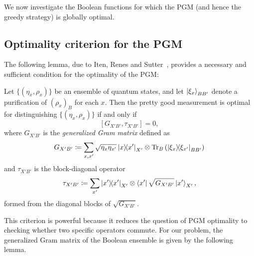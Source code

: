 We now investigate the Boolean functions for which the PGM (and hence the greedy strategy) is globally optimal.


\subsection{Optimality criterion for the PGM}

The following lemma, due to Iten, Renes and Sutter~\cite{iten2016pretty}, provides a necessary and sufficient condition for the optimality of the PGM:

\begin{lemma}\label{lem:ch5_qseq-pgmopt}
    Let $\{(\eta_x, \rho_x)\}$ be an ensemble of quantum states, and let $\ket{\xi_x}_{BB'}$ denote a purification of $(\rho_x)_B$ for each $x$.
    Then the pretty good measurement is optimal for distinguishing $\{(\eta_x, \rho_x)\}$ if and only if
    \begin{equation}\label{eq:ch5_qseq-PGM}
        [G_{X'B'},\tau_{X'B'}]=0,
    \end{equation}
    where $G_{X'B'}$ is the \emph{generalized Gram matrix} defined as
    \begin{equation}\label{eq:ch5_qseq-gengram}
        G_{X'B'} \coloneqq \sum_{x,x'} \sqrt{\eta_x \eta_{x'}} \ketbra{x}{x'}_{X'} \otimes \Tr_B\left(\ketbra{\xi_x}{\xi_{x'}}_{BB'}\right)
    \end{equation}
    and $\tau_{X'B'}$ is the block-diagonal operator
    \begin{equation}\label{eq:ch5_qseq-tau}
        \tau_{X'B'} \coloneqq \sum_{x'} \ketbra{x'}{x'}_{X'} \otimes \bra{x'}\sqrt{G_{X'B'}}\ket{x'}_{X'},
    \end{equation}
    formed from the diagonal blocks of $\sqrt{G_{X'B'}}$.
\end{lemma}

This criterion is powerful because it reduces the question of PGM optimality to checking whether two specific operators commute.
For our problem, the generalized Gram matrix of the Boolean ensemble is given by the following lemma.%

